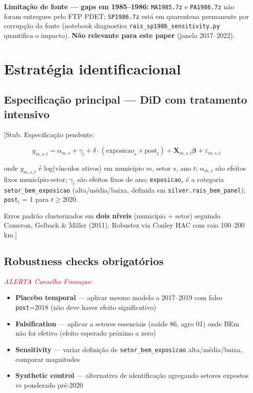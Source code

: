 \documentclass[12pt,a4paper,oneside]{article}
\begin{document}
\textbf{Limitação de fonte --- gaps em 1985--1986:}
\texttt{MA1985.7z} e \texttt{PA1986.7z} não foram entregues pelo FTP PDET;
\texttt{SP1986.7z} está em quarentena permanente por corrupção da fonte
(notebook diagnostics \texttt{rais\_sp1986\_sensitivity.py} quantifica
o impacto). \textbf{Não relevante para este paper} (janela 2017--2022).

\section{Estratégia identificacional}\label{sec:identificacao}

\subsection{Especificação principal --- DiD com tratamento intensivo}

[Stub. Especificação pendente:

\begin{equation}
y_{m,s,t} = \alpha_{m,s} + \gamma_t + \delta \cdot (\text{exposicao}_s
\times \text{post}_t) + \boldsymbol{X}_{m,s,t} \boldsymbol{\beta} +
\varepsilon_{m,s,t}
\end{equation}

onde $y_{m,s,t}$ é log(vínculos ativos) em município $m$, setor $s$,
ano $t$; $\alpha_{m,s}$ são efeitos fixos município-setor; $\gamma_t$
são efeitos fixos de ano; \texttt{exposicao}$_s$ é a categoria
\texttt{setor\_bem\_exposicao} (alta/média/baixa, definida em
\texttt{silver.rais\_bem\_panel}); \texttt{post}$_t$ = 1 para $t \geq 2020$.

Erros padrão clusterizados em \textbf{dois níveis} (município + setor)
seguindo Cameron, Gelbach \& Miller (2011). Robustez via Conley HAC
com raio 100--200 km.]

\subsection{Robustness checks obrigatórios}

\textcolor{red}{\textit{ALERTA Conselho Finanças:}}

\begin{itemize}
  \item \textbf{Placebo temporal} --- aplicar mesmo modelo a 2017--2019
        com falso \texttt{post}=2018 (não deve haver efeito significativo)
  \item \textbf{Falsification} --- aplicar a setores essenciais
        (saúde 86, agro 01) onde BEm não foi efetivo (efeito esperado
        próximo a zero)
  \item \textbf{Sensitivity} --- variar definição de
        \texttt{setor\_bem\_exposicao} alta/média/baixa, comparar
        magnitudes
  \item \textbf{Synthetic control} --- alternativa de identificação
        agregando setores expostos vs ponderado pré-2020
\end{itemize}
\end{document}
